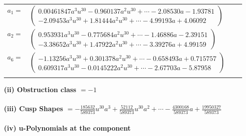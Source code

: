 \documentclass[1p]{elsarticle_modified}
\theoremstyle{definition}
\begin{document}
\begin{tabular}{m{7pt} m{180pt} m{7pt} m{180pt} }
\flushright $a_{1}=$&$\begin{pmatrix}0.00461847 a^{3} u^{30}-0.960137 a^{2} u^{30}+\cdots-2.08530 a-1.93781\\-2.09453 a^{3} u^{30}+1.81444 a^{2} u^{30}+\cdots-4.99193 a+4.06092\end{pmatrix}$ \\
\flushright $a_{2}=$&$\begin{pmatrix}0.953931 a^{3} u^{30}-0.775684 a^{2} u^{30}+\cdots-1.46886 a-2.39151\\-3.38652 a^{3} u^{30}+1.47922 a^{2} u^{30}+\cdots-3.39276 a+4.99159\end{pmatrix}$ \\
\flushright $a_{6}=$&$\begin{pmatrix}-1.13256 a^{3} u^{30}+0.301378 a^{2} u^{30}+\cdots-0.658493 a+0.715757\\0.609317 a^{3} u^{30}-0.0145222 a^{2} u^{30}+\cdots-2.67703 a-5.87958\end{pmatrix}$\\&\end{tabular}
\flushleft \textbf{(ii) Obstruction class $= -1$}\\~\\
\flushleft \textbf{(iii) Cusp Shapes $= -\frac{185632}{589373} u^{30} a^3+\frac{52112}{589373} u^{30} a^2+\cdots-\frac{4300168}{589373} a+\frac{19950327}{589373}$}\\~\\
\newpage\renewcommand{\arraystretch}{1}
\flushleft \textbf{(iv) u-Polynomials at the component}\newline \\
\end{document}
